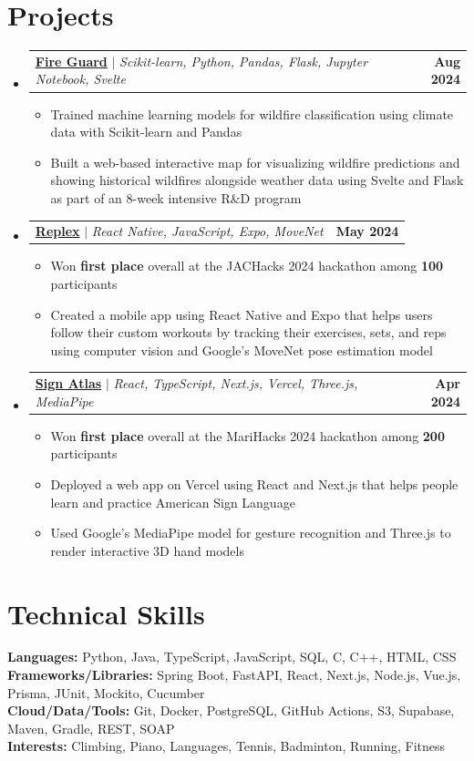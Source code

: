 \documentclass[letterpaper,11pt]{article}
\makeatletter
\newcommand{\resumeItem}[1]{
  \item\small{
    {#1 \vspace{-2pt}}
  }
}
\newcommand{\resumeProjectHeading}[4]{
  \item
  \begin{tabular*}{\textwidth}{l@{\extracolsep{\fill}}r}
    \small{\href{#3}{\textbf{#1}\hspace{0.3em}{\faLink}} $|$ \emph{#2}} & \textbf{\small #4} \\
  \end{tabular*}\vspace{-7pt}
}
\newcommand{\resumeSubHeadingListStart}{\begin{itemize}[leftmargin=0in, label={}]}
\newcommand{\resumeSubHeadingListEnd}{\end{itemize}}
\newcommand{\resumeItemListStart}{\begin{itemize}}
\newcommand{\resumeItemListEnd}{\end{itemize}\vspace{-5pt}}
\makeatother
\begin{document}
\section{Projects}
    \resumeSubHeadingListStart
      \resumeProjectHeading
          {Fire Guard}
          {Scikit-learn, Python, Pandas, Flask, Jupyter Notebook, Svelte}
          {https://github.com/tran-ethan/fire-guard}
          {Aug 2024}
          \resumeItemListStart
            \resumeItem{Trained machine learning models for wildfire classification using climate data with Scikit-learn and Pandas}
            \resumeItem{Built a web-based interactive map for visualizing wildfire predictions and showing historical wildfires alongside weather data using Svelte and Flask as part of an 8-week intensive R\&D program}
          \resumeItemListEnd
      \resumeProjectHeading
          {Replex}
          {React Native, JavaScript, Expo, MoveNet}
          {https://devpost.com/software/replex}
          {May 2024}
          \resumeItemListStart
            \resumeItem{Won \textbf{first place} overall at the JACHacks 2024 hackathon among \textbf{100} participants}
            \resumeItem{Created a mobile app using React Native and Expo that helps users follow their custom workouts by tracking their exercises, sets, and reps using computer vision and Google's MoveNet pose estimation model}
          \resumeItemListEnd
      \resumeProjectHeading
          {Sign Atlas}
          {React, TypeScript, Next.js, Vercel, Three.js, MediaPipe}
          {https://devpost.com/software/sign-atlas}
          {Apr 2024}
          \resumeItemListStart
            \resumeItem{Won \textbf{first place} overall at the MariHacks 2024 hackathon among \textbf{200} participants}
            \resumeItem{Deployed a web app on Vercel using React and Next.js that helps people learn and practice American Sign Language}
            \resumeItem{Used Google's MediaPipe model for gesture recognition and Three.js to render interactive 3D hand models}
          \resumeItemListEnd
    \resumeSubHeadingListEnd

\section{Technical Skills}
 \begin{itemize}[leftmargin=0in, label={}]
    \small{\item{
     \textbf{Languages:}{ Python, Java, TypeScript, JavaScript, SQL, C, C++, HTML, CSS} \\
     \textbf{Frameworks/Libraries:}{ Spring Boot, FastAPI, React, Next.js, Node.js, Vue.js, Prisma, JUnit, Mockito, Cucumber} \\
     \textbf{Cloud/Data/Tools:}{ Git, Docker, PostgreSQL, GitHub Actions, S3, Supabase, Maven, Gradle, REST, SOAP} \\
     \textbf{Interests:}{ Climbing, Piano, Languages, Tennis, Badminton, Running, Fitness } \\
    }}
 \end{itemize}

\end{document}
